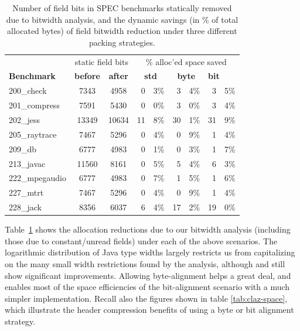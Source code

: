 \documentclass[preprint]{acmconf}
\begin{document}
\begin{table}
\begin{tabular}{lccr@{.}lr@{.}lr@{.}l}
&\multicolumn{2}{c}{static field bits}&
 \multicolumn{6}{c}{\% alloc'ed space saved} \\
\bf Benchmark &
\bf before & \bf after &
\multicolumn{2}{c}{\bf std} &
\multicolumn{2}{c}{\bf byte} &
\multicolumn{2}{l}{\bf bit} \\ \hline
200\_check	& 7343& 4958&  0&3\% &  3&4\% &  3&5\% \\
201\_compress	& 7591& 5430&  0&0\% &  3&0\% &  3&4\% \\
202\_jess	&13349&10634& 11&8\% & 30&1\% & 31&9\% \\
205\_raytrace	& 7467& 5296&  0&4\% &  0&9\% &  1&4\% \\
209\_db 	& 6777& 4983&  0&1\% &  0&3\% &  1&7\% \\
213\_javac	&11560& 8161&  0&5\% &  5&4\% &  6&3\% \\
222\_mpegaudio	& 6777& 4983&  0&7\% &  1&5\% &  1&6\% \\
227\_mtrt	& 7467& 5296&  0&4\% &  0&9\% &  1&4\% \\
228\_jack	& 8356& 6037&  6&4\% & 17&2\% & 19&0\% \\
\end{tabular}
\caption{Number of field bits in SPEC benchmarks statically removed
  due to bitwidth analysis,
  and the dynamic savings (in \% of total allocated bytes) of
  field bitwidth reduction under three different packing strategies.}
\label{tab:bitwidth-results}
\end{table}

Table~\ref{tab:bitwidth-results} shows the allocation reductions due
to our bitwidth
analysis (including those due to constant/unread fields)
under each of the above scenarios.  The logarithmic distribution of
Java type widths largely restricts us from capitalizing on the many small
width restrictions found by the analysis, although  and
 still show significant improvements.  Allowing
byte-alignment helps a great deal, and enables most of the space
efficiencies of the bit-alignment scenario with a much simpler
implementation.  Recall also the figures shown in
table \ref{tab:claz-space}, which illustrate the header compression
benefits of using a byte or bit alignment strategy.
\end{document}
